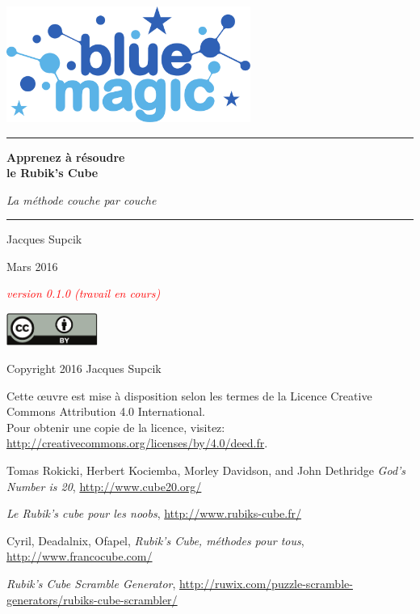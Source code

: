 \documentclass[10pt,paper=a5,pagesize]{scrbook}
\begin{document}
\frontmatter
\thispagestyle{empty}
\begin{titlepage}
\begin{center}
\includegraphics[width=8cm]{bluemagic_logo.pdf}
\vspace*{8mm}

\rule{\textwidth}{1pt}
{\Huge\textbf{Apprenez à résoudre\\
\medskip
le Rubik's Cube}}
\bigskip

{\LARGE\textit{La méthode \og couche par couche\fg}}
\rule{\textwidth}{1pt}
\vspace*{10mm}

{\Large Jacques Supcik}
\vspace*{10mm}

\enlargethispage{15mm}
{\Large Mars 2016}
\vfill

{\huge\textit{\textcolor{red}{version 0.1.0 (travail en cours)}}}

\end{center}
\end{titlepage}

\thispagestyle{empty}
\par\vspace*{\fill}
\includegraphics[width=30mm]{by.pdf}

Copyright \textcopyright{} 2016 Jacques Supcik

Cette œuvre est mise à disposition selon les termes de la Licence Creative Commons Attribution 4.0 International.
\medskip\\
Pour obtenir une copie de la licence, visitez:\\
\url{http://creativecommons.org/licenses/by/4.0/deed.fr}.
\newpage

\tableofcontents
\mainmatter



% 
% 


\backmatter
\begin{thebibliography}{9}
	
	 Tomas Rokicki, Herbert Kociemba, Morley Davidson, and John Dethridge
	\emph{God's Number is 20},
	\url{http://www.cube20.org/}

	\emph{Le Rubik's cube pour les noobs},
	\url{http://www.rubiks-cube.fr/}

	Cyril, Deadalnix, Ofapel,
	\emph{Rubik's Cube, méthodes pour tous},
	\url{http://www.francocube.com/}
	
	\emph{Rubik’s Cube Scramble Generator},
	\url{http://ruwix.com/puzzle-scramble-generators/rubiks-cube-scrambler/}
	
	
\end{thebibliography}
\end{document}
